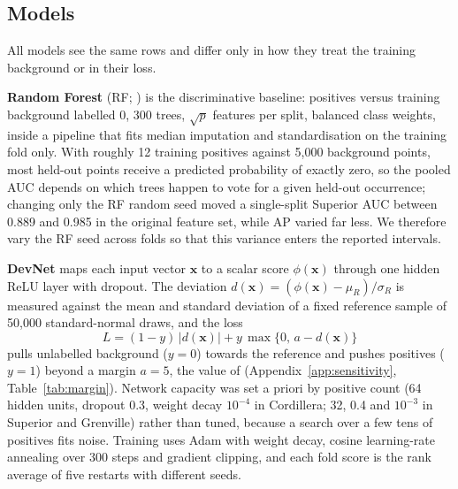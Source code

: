 \documentclass[pdflatex,sn-apa]{sn-jnl}
\begin{document}
\subsection{Models}\label{sec:models}

All models see the same rows and differ only in how they treat the training background or in their loss.

\textbf{Random Forest} (RF; \citealp{Breiman2001}) is the discriminative baseline: positives versus training background labelled 0, 300 trees, $\sqrt{p}$ features per split, balanced class weights, inside a pipeline that fits median imputation and standardisation on the training fold only. With roughly 12 training positives against 5,000 background points, most held-out points receive a predicted probability of exactly zero, so the pooled AUC depends on which trees happen to vote for a given held-out occurrence; changing only the RF random seed moved a single-split Superior AUC between 0.889 and 0.985 in the original feature set, while AP varied far less. We therefore vary the RF seed across folds so that this variance enters the reported intervals.

\textbf{DevNet} \citep{Pang2019} maps each input vector $\mathbf{x}$ to a scalar score $\phi(\mathbf{x})$ through one hidden ReLU layer with dropout. The deviation $d(\mathbf{x}) = (\phi(\mathbf{x}) - \mu_R)/\sigma_R$ is measured against the mean and standard deviation of a fixed reference sample of 50,000 standard-normal draws, and the loss
\begin{equation}
L = (1-y)\,|d(\mathbf{x})| + y\,\max\{0,\, a - d(\mathbf{x})\}
\end{equation}
pulls unlabelled background ($y=0$) towards the reference and pushes positives ($y=1$) beyond a margin $a = 5$, the value of \citet{Pang2019} (Appendix~\ref{app:sensitivity}, Table~\ref{tab:margin}). Network capacity was set a priori by positive count (64 hidden units, dropout 0.3, weight decay $10^{-4}$ in Cordillera; 32, 0.4 and $10^{-3}$ in Superior and Grenville) rather than tuned, because a search over a few tens of positives fits noise. Training uses Adam \citep{Kingma2014} with weight decay, cosine learning-rate annealing over 300 steps and gradient clipping, and each fold score is the rank average of five restarts with different seeds.
\end{document}
